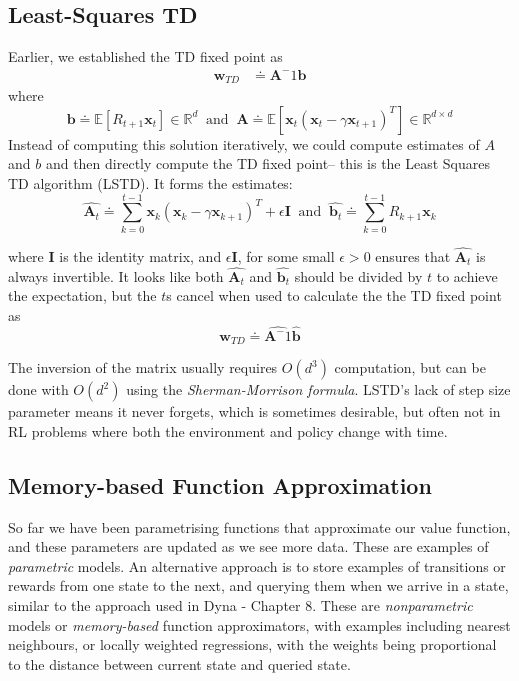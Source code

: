 \subsection{Least-Squares TD}
Earlier, we established the TD fixed point as
\begin{align}
\textbf{w}_{TD} &\doteq \textbf{A}^-1\textbf{b}
\end{align}
where
\begin{equation}
\textbf{b} \doteq \mathbb{E}[R_{t+1} \textbf{x}_t] \in \mathbb{R}^d \; \; \text{and} \; \; \textbf{A} \doteq \mathbb{E}\left[\textbf{x}_t(\textbf{x}_t - \gamma \textbf{x}_{t+1})^T\right] \in \mathbb{R}^{d \times d}
\end{equation}
Instead of computing this solution iteratively, we could compute estimates of $A$ and $b$ and then directly compute the TD fixed point– this is the Least Squares TD algorithm (LSTD). It forms the estimates:
\begin{equation}
\hat{\textbf{A}_t} \doteq \sum_{k=0}^{t-1} \textbf{x}_k(\textbf{x}_k - \gamma \textbf{x}_{k+1})^T + \epsilon \textbf{I} \; \; \text{and} \; \; \hat{\textbf{b}_t} \doteq \sum_{k=0}^{t-1} R_{k+1}\textbf{x}_k
\end{equation}

where $\textbf{I}$ is the identity matrix, and $\epsilon \textbf{I}$, for some small $\epsilon > 0$ ensures that $\hat{\textbf{A}_t}$ is always invertible. It looks like both $\hat{\textbf{A}_t}$ and $\hat{\textbf{b}_t}$ should be divided by $t$ to achieve the expectation, but the $t$s cancel when used to calculate the the TD fixed point as 
\begin{equation}
\textbf{w}_{TD} \doteq \hat{\textbf{A}^-1}\hat{\textbf{b}}
\end{equation}

The inversion of the matrix usually requires $O(d^3)$ computation, but can be done with $O(d^2)$ using the \textit{Sherman-Morrison formula}. LSTD's lack of step size parameter means it never forgets, which is sometimes desirable, but often not in RL problems where both the environment and policy change with time.

\subsection{Memory-based Function Approximation}
So far we have been parametrising functions that approximate our value function, and these parameters are updated as we see more data. These are examples of \textit{parametric} models. An alternative approach is to store examples of transitions or rewards from one state to the next, and querying them when we arrive in a state, similar to the approach used in Dyna - Chapter 8. These are \textit{nonparametric} models or \textit{memory-based} function approximators, with examples including nearest neighbours, or locally weighted regressions, with the weights being proportional to the distance between current state and queried state.

